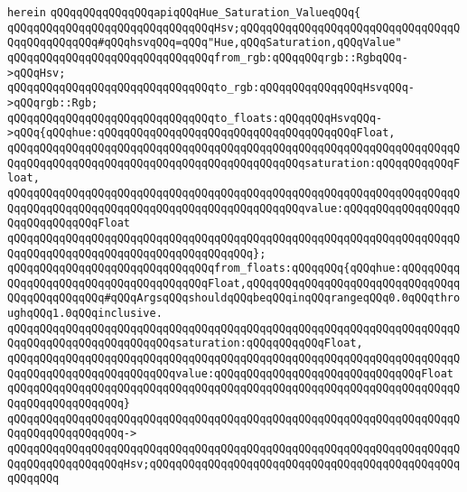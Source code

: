 \verb|herein|\newline
\verb|qQQqqQQqqQQqqQQqapiqQQqHue_Saturation_ValueqQQq{|\newline
\newline
\verb|qQQqqQQqqQQqqQQqqQQqqQQqqQQqqQQqHsv;qQQqqQQqqQQqqQQqqQQqqQQqqQQqqQQqqQQqqQQqqQQqqQQq#qQQqhsvqQQq=qQQq"Hue,qQQqSaturation,qQQqValue"|\newline
\newline
\verb|qQQqqQQqqQQqqQQqqQQqqQQqqQQqqQQqfrom_rgb:qQQqqQQqrgb::RgbqQQq->qQQqHsv;|\newline
\verb|qQQqqQQqqQQqqQQqqQQqqQQqqQQqqQQqto_rgb:qQQqqQQqqQQqqQQqHsvqQQq->qQQqrgb::Rgb;|\newline
\newline
\verb|qQQqqQQqqQQqqQQqqQQqqQQqqQQqqQQqto_floats:qQQqqQQqHsvqQQq->qQQq{qQQqhue:qQQqqQQqqQQqqQQqqQQqqQQqqQQqqQQqqQQqqQQqFloat,|\newline
\verb|qQQqqQQqqQQqqQQqqQQqqQQqqQQqqQQqqQQqqQQqqQQqqQQqqQQqqQQqqQQqqQQqqQQqqQQqqQQqqQQqqQQqqQQqqQQqqQQqqQQqqQQqqQQqqQQqqQQqsaturation:qQQqqQQqqQQqFloat,|\newline
\verb|qQQqqQQqqQQqqQQqqQQqqQQqqQQqqQQqqQQqqQQqqQQqqQQqqQQqqQQqqQQqqQQqqQQqqQQqqQQqqQQqqQQqqQQqqQQqqQQqqQQqqQQqqQQqqQQqqQQqvalue:qQQqqQQqqQQqqQQqqQQqqQQqqQQqqQQqFloat|\newline
\verb|qQQqqQQqqQQqqQQqqQQqqQQqqQQqqQQqqQQqqQQqqQQqqQQqqQQqqQQqqQQqqQQqqQQqqQQqqQQqqQQqqQQqqQQqqQQqqQQqqQQqqQQqqQQq};|\newline
\newline
\verb|qQQqqQQqqQQqqQQqqQQqqQQqqQQqqQQqfrom_floats:qQQqqQQq{qQQqhue:qQQqqQQqqQQqqQQqqQQqqQQqqQQqqQQqqQQqqQQqFloat,qQQqqQQqqQQqqQQqqQQqqQQqqQQqqQQqqQQqqQQqqQQqqQQq#qQQqArgsqQQqshouldqQQqbeqQQqinqQQqrangeqQQq0.0qQQqthroughqQQq1.0qQQqinclusive.|\newline
\verb|qQQqqQQqqQQqqQQqqQQqqQQqqQQqqQQqqQQqqQQqqQQqqQQqqQQqqQQqqQQqqQQqqQQqqQQqqQQqqQQqqQQqqQQqqQQqqQQqsaturation:qQQqqQQqqQQqFloat,|\newline
\verb|qQQqqQQqqQQqqQQqqQQqqQQqqQQqqQQqqQQqqQQqqQQqqQQqqQQqqQQqqQQqqQQqqQQqqQQqqQQqqQQqqQQqqQQqqQQqqQQqvalue:qQQqqQQqqQQqqQQqqQQqqQQqqQQqqQQqFloat|\newline
\verb|qQQqqQQqqQQqqQQqqQQqqQQqqQQqqQQqqQQqqQQqqQQqqQQqqQQqqQQqqQQqqQQqqQQqqQQqqQQqqQQqqQQqqQQq}|\newline
\verb|qQQqqQQqqQQqqQQqqQQqqQQqqQQqqQQqqQQqqQQqqQQqqQQqqQQqqQQqqQQqqQQqqQQqqQQqqQQqqQQqqQQqqQQq->|\newline
\verb|qQQqqQQqqQQqqQQqqQQqqQQqqQQqqQQqqQQqqQQqqQQqqQQqqQQqqQQqqQQqqQQqqQQqqQQqqQQqqQQqqQQqqQQqHsv;qQQqqQQqqQQqqQQqqQQqqQQqqQQqqQQqqQQqqQQqqQQqqQQqqQQqqQQq|\newline
